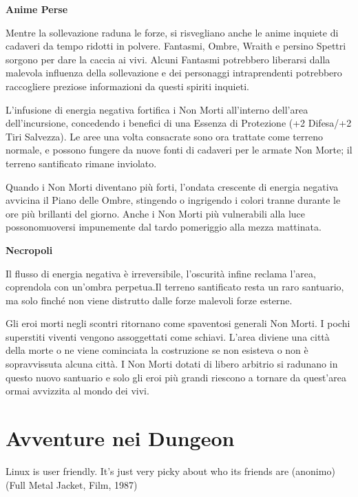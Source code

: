 \documentclass[a4paper,11pt,twoside,openany]{book}
\begin{document}
\textbf{Anime Perse}

Mentre la sollevazione raduna le forze, si risvegliano anche le anime inquiete di cadaveri da tempo ridotti in polvere. Fantasmi, Ombre, Wraith e persino Spettri sorgono per dare la caccia ai vivi. Alcuni Fantasmi potrebbero liberarsi dalla malevola influenza della sollevazione e dei personaggi intraprendenti potrebbero raccogliere preziose informazioni da questi spiriti inquieti.

L'infusione di energia negativa fortifica i Non Morti all'interno dell'area dell'incursione, concedendo i benefici di una Essenza di Protezione (+2 Difesa/+2 Tiri Salvezza). Le aree una volta consacrate sono ora trattate come terreno normale, e possono fungere da nuove fonti di cadaveri per le armate Non Morte; il terreno santificato rimane inviolato.

Quando i Non Morti diventano più forti, l'ondata crescente di energia negativa avvicina il Piano delle Ombre, stingendo o ingrigendo i colori tranne durante le ore più brillanti del giorno. Anche i Non Morti più vulnerabili alla luce possonomuoversi impunemente dal tardo pomeriggio alla mezza mattinata.

\textbf{Necropoli}

Il flusso di energia negativa è irreversibile, l'oscurità infine reclama l'area, coprendola con un'ombra perpetua.Il terreno santificato resta un raro santuario, ma solo finché non viene distrutto dalle forze malevoli forze esterne.

Gli eroi morti negli scontri ritornano come spaventosi generali Non Morti. I pochi superstiti viventi vengono assoggettati come schiavi. L'area diviene una città della morte o ne viene cominciata la costruzione se non esisteva o non è sopravvissuta alcuna città. I Non Morti dotati di libero arbitrio si radunano in questo nuovo santuario e solo gli eroi più grandi riescono a tornare da quest'area ormai avvizzita al mondo dei vivi.

\pagebreak

\section{Avventure nei Dungeon}

\begin{tcolorbox}[enhanced,arc=5pt,boxrule=0.3pt]{
Linux is user friendly. It's just very picky about who its friends are (anonimo) (Full Metal Jacket, Film, 1987)}\end{tcolorbox}
\medskip
\end{document}
